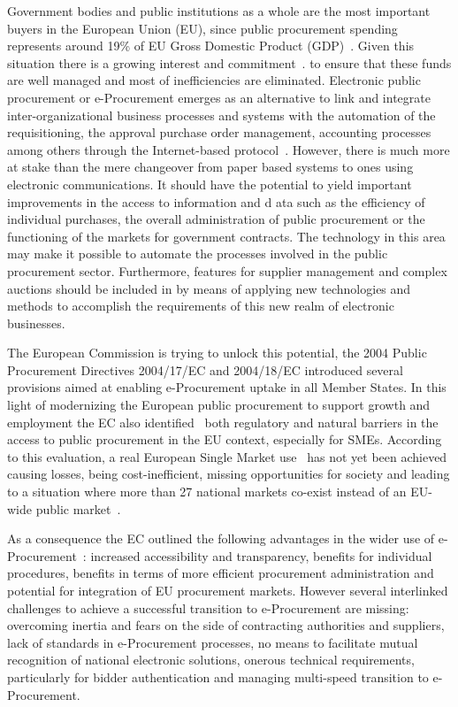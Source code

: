 Government bodies and public institutions as a whole are the most important buyers in the European Union (EU), since public procurement spending represents around 19\% of 
EU Gross Domestic Product (GDP)~\cite{d2010}. Given this situation there is a growing interest and commitment~\cite{d2010a}. to ensure that these funds are 
well managed and most of inefficiencies are eliminated. Electronic public procurement or e-Procurement emerges as an alternative to link and 
integrate inter-organizational business processes and systems with the automation of the requisitioning, the approval purchase order 
management, accounting processes among others through the Internet-based protocol~\cite{Podlogar2007}.  However, there is much more at stake than the mere changeover 
from paper based systems to ones using electronic communications. It should have the potential to yield important improvements in the access to information and d
ata such as the efficiency of individual purchases, the overall administration of public procurement or the functioning of the markets for government contracts. 
The technology in this area may make it possible to automate the processes involved in the public procurement sector. Furthermore, features for supplier 
management and complex auctions should be included in by means of applying new technologies and methods to accomplish the requirements of this new realm of electronic businesses.


The European Commission is trying to unlock this potential, the 2004 Public Procurement Directives 2004/17/EC and 2004/18/EC 
introduced several provisions aimed at enabling e-Procurement uptake in all Member States. In this light of 
modernizing the European public procurement to support growth and employment the EC also identified~\cite{siemensEval} both regulatory and natural barriers in the access to 
public procurement in the EU context, especially for SMEs. According to this evaluation, a real European Single Market use~\cite{d2011} 
has not yet been achieved causing losses, being cost-inefficient, missing opportunities for society and leading to a 
situation where more than 27 national markets co-exist instead of an EU-wide public market~\cite{monti2010}.

As a consequence the EC outlined the following advantages in the wider use of e-Procurement~\cite{d2010}: increased accessibility and transparency, benefits for individual procedures, 
benefits in terms of more efficient procurement administration and potential for integration of EU procurement markets. 
However several interlinked challenges to achieve a successful transition to e-Procurement are missing: overcoming inertia 
and fears on the side of contracting authorities and suppliers, lack of standards in e-Procurement processes, no means 
to facilitate mutual recognition of national electronic solutions, onerous technical requirements, 
particularly for bidder authentication and managing multi-speed transition to e-Procurement. 


